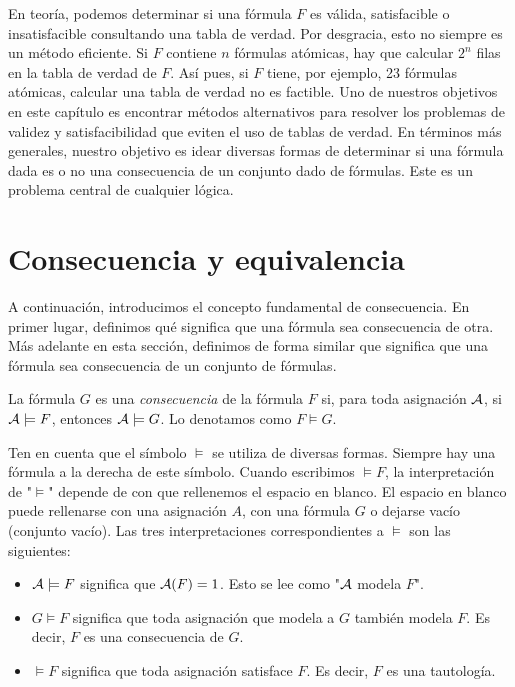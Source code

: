 \documentclass[12pt,a4paper]{book}
\newcommand{\comillas}[1]{"#1"}
\begin{document}
    En teoría, podemos determinar si una fórmula $F$ es válida, satisfacible o insatisfacible consultando una tabla de verdad. Por desgracia, esto no siempre
    es un método eficiente. Si $F$ contiene $n$ fórmulas atómicas, hay que calcular $2^{n}$ filas en la tabla de verdad de $F$. Así pues, si $F$ tiene, por ejemplo,
    23 fórmulas atómicas, calcular una tabla de verdad no es factible. Uno de nuestros objetivos en este capítulo es encontrar métodos alternativos para resolver
    los problemas de validez y satisfacibilidad que eviten el uso de tablas de verdad. En términos más generales, nuestro objetivo es idear diversas formas de
    determinar si una fórmula dada es o no una consecuencia de un conjunto dado de fórmulas. Este es un problema central de cualquier lógica.

    \section{Consecuencia y equivalencia}

    A continuación, introducimos el concepto fundamental de consecuencia. En primer lugar, definimos qué significa que una fórmula sea consecuencia
    de otra. Más adelante en esta sección, definimos de forma similar que significa que una fórmula sea consecuencia de un conjunto de fórmulas.

    \begin{definicion}
        La fórmula $G$ es una \textit{consecuencia} de la fórmula $F$ si, para toda asignación $\AA$, si $\AA\models F$, entonces $\AA\models G$. Lo denotamos como
        $F\models G$.
    \end{definicion}

    Ten en cuenta que el símbolo $\models$ se utiliza de diversas formas. Siempre hay una fórmula a la derecha de este símbolo. Cuando escribimos $\models F$,
    la interpretación de \comillas{$\models$} depende de con que rellenemos el espacio en blanco. El espacio en blanco puede rellenarse con una asignación $A$,
    con una fórmula $G$ o dejarse vacío (conjunto vacío). Las tres interpretaciones correspondientes a $\models$ son las siguientes:

    \begin{itemize}
        \item[$\bullet$] $\AA\models F$ significa que $\AA(F)=1$. Esto se lee como \comillas{$\AA$ modela $F$}.
        \item[$\bullet$] $G\models F$ significa que toda asignación que modela a $G$ también modela $F$. Es decir, $F$ es una consecuencia de $G$.
        \item[$\bullet$] $\models F$ significa que toda asignación satisface $F$. Es decir, $F$ es una tautología. 
    \end{itemize}
\end{document}
